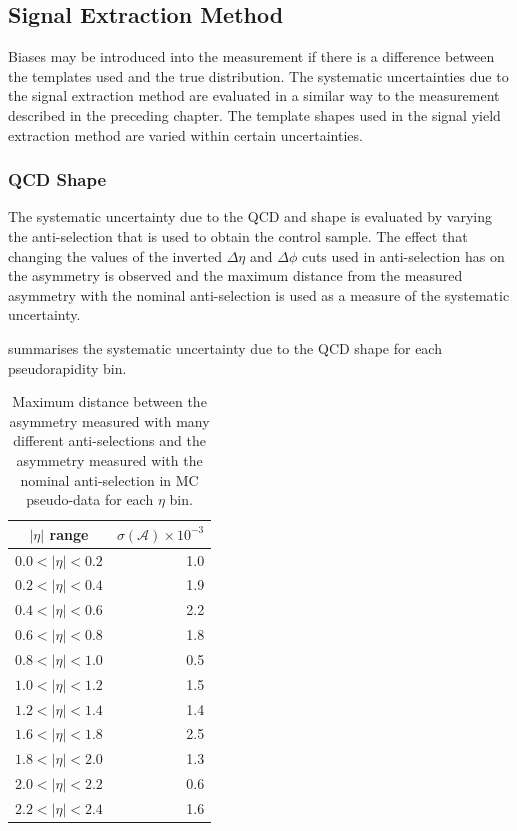 \subsection{Signal Extraction Method}
Biases may be introduced into the measurement if there is a
difference between the \ETm templates used and the true \ETm distribution. 
The systematic uncertainties due to the signal extraction method are evaluated
in a similar way to the measurement described in the preceding chapter.  The
template shapes used in the signal yield extraction method are varied within
certain uncertainties. 

\subsubsection{QCD \ETm Shape}
The systematic uncertainty due to the {QCD} and \gjet \ETm shape is evaluated
by varying the anti-selection that is used to obtain the control sample. The
effect that changing the values of the inverted $\Delta\eta$ and $\Delta\phi$
cuts used in anti-selection has on the asymmetry is observed and the maximum
distance from the measured asymmetry with the nominal anti-selection is used as a
measure of the systematic uncertainty.

 summarises the systematic uncertainty due to the
{QCD} \ETm shape for each pseudorapidity bin.

\begin{table}[htbp]
\begin{center}
\begin{tabular}{cr}
\toprule
$|\eta|$ range  & $\sigma(\mathcal{A}) \times 10^{-3}$\\
\midrule
$0.0<|\eta|<0.2$ & 1.0\\
$0.2<|\eta|<0.4$ & 1.9\\
$0.4<|\eta|<0.6$ & 2.2\\
$0.6<|\eta|<0.8$ & 1.8\\
$0.8<|\eta|<1.0$ & 0.5\\
$1.0<|\eta|<1.2$ & 1.5\\
$1.2<|\eta|<1.4$ & 1.4\\
$1.6<|\eta|<1.8$ & 2.5\\
$1.8<|\eta|<2.0$ & 1.3\\
$2.0<|\eta|<2.2$ & 0.6\\
$2.2<|\eta|<2.4$ & 1.6\\
\bottomrule
\end{tabular}
\caption[Maximum distance between the asymmetry measured with many different
anti-selections and the asymmetry measured with the nominal anti-selection in MC
pseudo-data.]{Maximum distance between the asymmetry measured with
many different anti-selections and the asymmetry measured with the nominal
anti-selection in MC pseudo-data for each $\eta$
bin\cite{bendavid2011electron}.}

\label{tab:updatedsystQCD}
\end{center}
\end{table}

